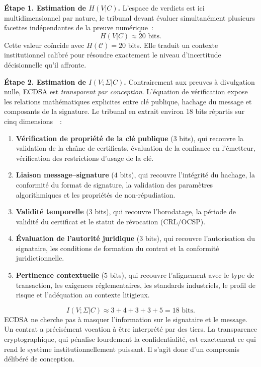 \begin{sloppypar}
\noindent\textbf{\'Etape 1. Estimation de $H(V|C)$.} L'espace de verdicts est
ici multidimensionnel par nature, le tribunal devant \'evaluer simultan\'ement
plusieurs facettes ind\'ependantes de la preuve num\'erique~:
\begin{equation}
H(V|C) \approx 20 \text{ bits}.
\label{eq:hvc_ecdsa}
\end{equation}
Cette valeur co\"incide avec $H(\mathcal{C}) = 20$ bits. Elle traduit un
contexte institutionnel calibr\'e pour r\'esoudre exactement le niveau
d'incertitude d\'ecisionnelle qu'il affronte.

\noindent\textbf{\'Etape 2. Estimation de $I(V;\Sigma|C)$.} Contrairement aux
preuves \`a divulgation nulle, ECDSA est \emph{transparent par conception}.
L'\'equation de v\'erification expose les relations math\'ematiques explicites
entre cl\'e publique, hachage du message et composants de la signature. Le
tribunal en extrait environ $18$ bits r\'epartis sur cinq
dimensions~\cite{MINKA2026CLO}~:
\begin{enumerate}
\item \textbf{V\'erification de propri\'et\'e de la cl\'e publique} ($3$ bits), qui recouvre la
      validation de la cha\^{\i}ne de certificats, \'evaluation de la confiance
      en l'\'emetteur, v\'erification des restrictions d'usage de la cl\'e.
\item \textbf{Liaison message--signature} ($4$ bits), qui recouvre l'int\'egrit\'e du hachage,
      la conformit\'e du format de signature, la validation des param\`etres
      algorithmiques et les propri\'et\'es de non-r\'epudiation.
\item \textbf{Validit\'e temporelle} ($3$ bits), qui recouvre l'horodatage, la p\'eriode de
      validit\'e du certificat et le statut de r\'evocation (CRL/OCSP).
\item \textbf{\'Evaluation de l'autorit\'e juridique} ($3$ bits), qui recouvre l'autorisation du
      signataire, les conditions de formation du contrat et la conformit\'e
      juridictionnelle.
\item \textbf{Pertinence contextuelle} ($5$ bits), qui recouvre l'alignement avec le type de
      transaction, les exigences r\'eglementaires, les standards industriels, le profil de
      risque et l'ad\'equation au contexte litigieux.
\end{enumerate}
\begin{equation}
I(V;\Sigma|C) \approx 3 + 4 + 3 + 3 + 5 = 18 \text{ bits}.
\label{eq:ivc_ecdsa}
\end{equation}
ECDSA ne cherche pas \`a masquer l'information sur le signataire et le
message. Un contrat a pr\'ecis\'ement vocation \`a \^etre interpr\'et\'e par des
tiers. La transparence cryptographique, qui p\'enalise lourdement la
confidentialit\'e, est exactement ce qui rend le syst\`eme institutionnellement
puissant. Il s'agit donc d'un compromis d\'elib\'er\'e de conception.


\end{sloppypar}
